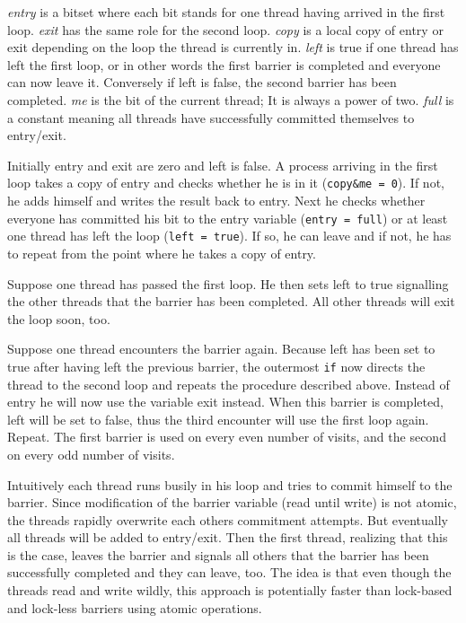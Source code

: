 \documentclass[a4paper, 10pt]{article}
\begin{document}
\emph{entry} is a bitset where each bit stands for one thread having arrived in the first loop. \emph{exit} has the same role for the second loop. \emph{copy} is a local copy of entry or exit depending on the loop the thread is currently in. \emph{left} is true if one thread has left the first loop, or in other words the first barrier is completed and everyone can now leave it. Conversely if left is false, the second barrier has been completed. \emph{me} is the bit of the current thread; It is always a power of two. \emph{full} is a constant meaning all threads have successfully committed themselves to entry/exit.

Initially entry and exit are zero and left is false. A process arriving in the first loop takes a copy of entry and checks whether he is in it (\texttt{copy\&me = 0}). If not, he adds himself and writes the result back to entry. Next he checks whether everyone has committed his bit to the entry variable (\texttt{entry = full}) or at least one thread has left the loop (\texttt{left = true}). If so, he can leave and if not, he has to repeat from the point where he takes a copy of entry.

Suppose one thread has passed the first loop. He then sets left to true signalling the other threads that the barrier has been completed. All other threads will exit the loop soon, too.

Suppose one thread encounters the barrier again. Because left has been set to true after having left the previous barrier, the outermost \texttt{if} now directs the thread to the second loop and repeats the procedure described above. Instead of entry he will now use the variable exit instead. When this barrier is completed, left will be set to false, thus the third encounter will use the first loop again. Repeat. The first barrier is used on every even number of visits, and the second on every odd number of visits.

Intuitively each thread runs busily in his loop and tries to commit himself to the barrier. Since modification of the barrier variable (read until write) is not atomic, the threads rapidly overwrite each others commitment attempts. But eventually all threads will be added to entry/exit. Then the first thread, realizing that this is the case, leaves the barrier and signals all others that the barrier has been successfully completed and they can leave, too. The idea is that even though the threads read and write wildly, this approach is potentially faster than lock-based and lock-less barriers using atomic operations.
\end{document}
